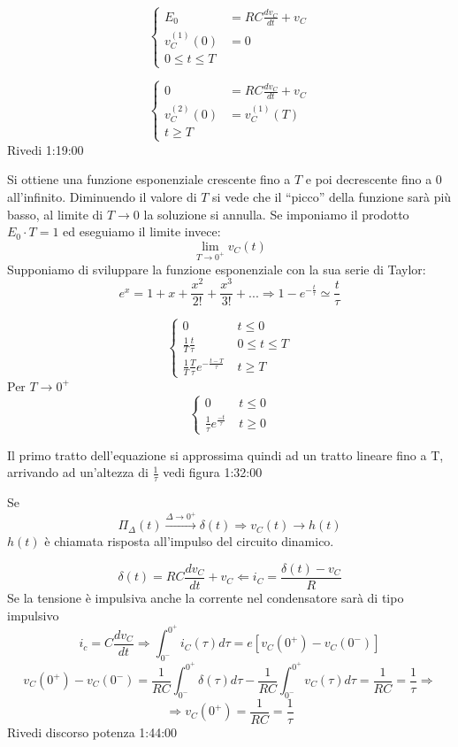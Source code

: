 $$
\begin{cases}
E_0 &= RC\frac{dv_C}{dt} + v_C \\
v_C^{(1)}(0) &= 0 \\
0 \leq t \leq T
\end{cases}
$$

$$
\begin{cases}
0 &= RC\frac{dv_C}{dt} + v_C \\
v_C^{(2)}(0) &= v_C^{(1)}(T) \\
t \geq T
\end{cases}
$$
Rivedi 1:19:00

Si ottiene una funzione esponenziale crescente fino a $T$ e poi decrescente fino a 0 all'infinito.
Diminuendo il valore di $T$ si vede che il ``picco'' della funzione sarà più basso, al limite 
di $T \rightarrow 0$ la soluzione si annulla.
Se imponiamo il prodotto $E_0\cdot T = 1$ ed eseguiamo il limite invece:
$$
\lim_{T\rightarrow0^+} v_C(t)
$$
Supponiamo di sviluppare la funzione esponenziale con la sua serie di Taylor:
$$
e^x = 1 + x + \frac{x^2}{2!} + \frac{x^3}{3!} + ... \Rightarrow 1-e^{-\frac{t}{\tau}} \simeq \frac{t}{\tau} 
$$

$$
\begin{cases}
0\ & t\leq 0 \\
\frac{1}{T}\frac{t}{\tau}\  & 0 \leq t\leq T \\
\frac{1}{T}\frac{T}{\tau} e^{-\frac{t-T}{\tau}}\ & t\geq T
\end{cases}
$$
Per $T\rightarrow 0^+$
$$
\begin{cases}
0\ & t\leq 0\\
\frac{1}{\tau}e^{\frac{-t}{\tau}}\ & t \geq 0
\end{cases}
$$

Il primo tratto dell'equazione si approssima quindi ad un tratto lineare fino a T, arrivando ad 
un'altezza di $\frac{1}{\tau}$ vedi figura 1:32:00

Se 
$$\Pi_\Delta(t) \stackrel{\Delta\rightarrow0^+}{\rightarrow} \delta(t) \Rightarrow v_C(t) \rightarrow h(t)$$
$h(t)$ è chiamata risposta all'impulso del circuito dinamico.

$$
\delta(t) = RC\frac{dv_C}{dt} + v_C \Leftarrow i_C = \frac{\delta(t)-v_C}{R}
$$
Se la tensione è impulsiva anche la corrente nel condensatore sarà di tipo impulsivo
$$
i_c = C\frac{dv_C}{dt} \Rightarrow \int_{0^-}^{0^+} i_C(\tau)d\tau = e[v_C(0^+)-v_C(0^-)]
$$
$$
v_C(0^+) - v_C(0^-) = \frac{1}{RC} \int_{0^-}^{0^+} \delta(\tau)d\tau - \frac{1}{RC} \int_{0^-}^{0^+} v_C(\tau)d\tau = \frac{1}{RC} = \frac{1}{\tau} \Rightarrow 
$$
$$
\Rightarrow v_C(0^+) = \frac{1}{RC} = \frac{1}{\tau}
$$
Rivedi discorso potenza 1:44:00

